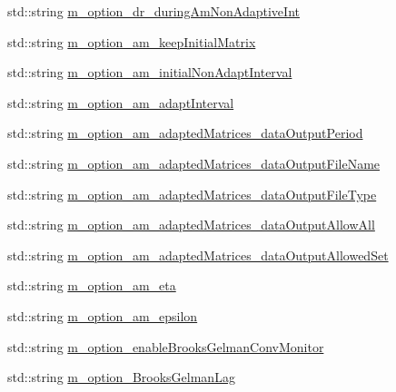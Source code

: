 \begin{DoxyCompactItemize}
\item 
std\-::string \hyperlink{class_q_u_e_s_o_1_1_metropolis_hastings_s_g_options_a86c8a503d026c8a112de8cfcb30e3a08}{m\-\_\-option\-\_\-dr\-\_\-during\-Am\-Non\-Adaptive\-Int}
\item 
std\-::string \hyperlink{class_q_u_e_s_o_1_1_metropolis_hastings_s_g_options_a1974e4434e6e24ce67198f122f20ab7c}{m\-\_\-option\-\_\-am\-\_\-keep\-Initial\-Matrix}
\item 
std\-::string \hyperlink{class_q_u_e_s_o_1_1_metropolis_hastings_s_g_options_a0293597878cab98eb6190ff67a0f3299}{m\-\_\-option\-\_\-am\-\_\-initial\-Non\-Adapt\-Interval}
\item 
std\-::string \hyperlink{class_q_u_e_s_o_1_1_metropolis_hastings_s_g_options_aad5313349ed8553e95b0d867499b4cc9}{m\-\_\-option\-\_\-am\-\_\-adapt\-Interval}
\item 
std\-::string \hyperlink{class_q_u_e_s_o_1_1_metropolis_hastings_s_g_options_ac9a445e5def0140cc6cda1288bce2766}{m\-\_\-option\-\_\-am\-\_\-adapted\-Matrices\-\_\-data\-Output\-Period}
\item 
std\-::string \hyperlink{class_q_u_e_s_o_1_1_metropolis_hastings_s_g_options_a50b5f394825d9c8848d11bd7636e2b5c}{m\-\_\-option\-\_\-am\-\_\-adapted\-Matrices\-\_\-data\-Output\-File\-Name}
\item 
std\-::string \hyperlink{class_q_u_e_s_o_1_1_metropolis_hastings_s_g_options_a0f0a406b0e8cce9d82a4534dfb45c23b}{m\-\_\-option\-\_\-am\-\_\-adapted\-Matrices\-\_\-data\-Output\-File\-Type}
\item 
std\-::string \hyperlink{class_q_u_e_s_o_1_1_metropolis_hastings_s_g_options_ac45686ae902b17824aa18e6414fc9039}{m\-\_\-option\-\_\-am\-\_\-adapted\-Matrices\-\_\-data\-Output\-Allow\-All}
\item 
std\-::string \hyperlink{class_q_u_e_s_o_1_1_metropolis_hastings_s_g_options_a850b7d178f40d3afbfc2e82cbbcaf25f}{m\-\_\-option\-\_\-am\-\_\-adapted\-Matrices\-\_\-data\-Output\-Allowed\-Set}
\item 
std\-::string \hyperlink{class_q_u_e_s_o_1_1_metropolis_hastings_s_g_options_af33c4f035c1e61c9c2109621ee2c61df}{m\-\_\-option\-\_\-am\-\_\-eta}
\item 
std\-::string \hyperlink{class_q_u_e_s_o_1_1_metropolis_hastings_s_g_options_a7a7a303ed2fc5905cb58a42ea53c1d66}{m\-\_\-option\-\_\-am\-\_\-epsilon}
\item 
std\-::string \hyperlink{class_q_u_e_s_o_1_1_metropolis_hastings_s_g_options_a20bec7fcde9b7f19c0b19dfbb1cf0391}{m\-\_\-option\-\_\-enable\-Brooks\-Gelman\-Conv\-Monitor}
\item 
std\-::string \hyperlink{class_q_u_e_s_o_1_1_metropolis_hastings_s_g_options_aba5c080f85571b64975d41498774ab3c}{m\-\_\-option\-\_\-\-Brooks\-Gelman\-Lag}
\end{DoxyCompactItemize}


